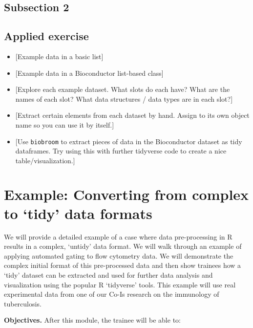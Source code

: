 \documentclass[]{tufte-book}
\providecommand{\tightlist}{%
  \setlength{\itemsep}{0pt}\setlength{\parskip}{0pt}}
\begin{document}
\hypertarget{subsection-2-6}{%
\subsection{Subsection 2}\label{subsection-2-6}}

\hypertarget{applied-exercise-5}{%
\subsection{Applied exercise}\label{applied-exercise-5}}

\begin{itemize}
\tightlist
\item
  {[}Example data in a basic list{]}
\item
  {[}Example data in a Bioconductor list-based class{]}
\item
  {[}Explore each example dataset. What slots do each have? What are the names of each slot?
  What data structures / data types are in each slot?{]}
\item
  {[}Extract certain elements from each dataset by hand. Assign to its own object name so
  you can use it by itself.{]}
\item
  {[}Use \texttt{biobroom} to extract pieces of data in the Bioconductor dataset as tidy dataframes.
  Try using this with further tidyverse code to create a nice table/visualization.{]}
\end{itemize}

\hypertarget{example-converting-from-complex-to-tidy-data-formats}{%
\section{Example: Converting from complex to `tidy' data formats}\label{example-converting-from-complex-to-tidy-data-formats}}

We will provide a detailed example of a case where data pre-processing in R
results in a complex, `untidy' data format. We will walk through an example of
applying automated gating to flow cytometry data. We will demonstrate the
complex initial format of this pre-processed data and then show trainees how a
`tidy' dataset can be extracted and used for further data analysis and
visualization using the popular R `tidyverse' tools. This example will use real
experimental data from one of our Co-Is research on the immunology of
tuberculosis.

\textbf{Objectives.} After this module, the trainee will be able to:
\end{document}
